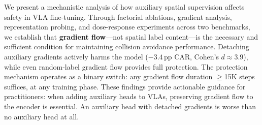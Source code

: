 \documentclass[letterpaper]{article}
\begin{document}
We present a mechanistic analysis of how auxiliary spatial supervision affects safety in VLA fine-tuning. Through factorial ablations, gradient analysis, representation probing, and dose-response experiments across two benchmarks, we establish that \textbf{gradient flow}---not spatial label content---is the necessary and sufficient condition for maintaining collision avoidance performance. Detaching auxiliary gradients actively harms the model ($-3.4$\,pp CAR, Cohen's $d \approx 3.9$), while even random-label gradient flow provides full protection. The protection mechanism operates as a binary switch: any gradient flow duration $\geq$15K steps suffices, at any training phase. These findings provide actionable guidance for practitioners: when adding auxiliary heads to VLAs, preserving gradient flow to the encoder is essential. An auxiliary head with detached gradients is worse than no auxiliary head at all.
\end{document}
